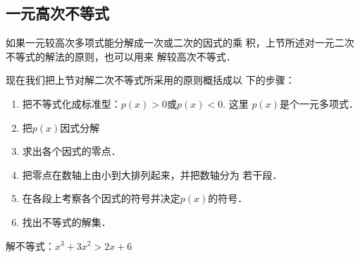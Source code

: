 \subsection{一元高次不等式}
如果一元较高次多项式能分解成一次或二次的因式的乘
积，上节所述对一元二次不等式的解法的原则，也可以用来
解较高次不等式．

现在我们把上节对解二次不等式所采用的原则概括成以
下的步骤：
\begin{enumerate}
    \item 把不等式化成标准型：$p(x)>0$或$p(x)<0$. 这里
$p(x)$是个一元多项式．
\item 把$p(x)$因式分解
\item 求出各个因式的零点．
\item 把零点在数轴上由小到大排列起来，并把数轴分为
若干段．
\item 在各段上考察各个因式的符号并决定$p(x)$的符号．
\item 找出不等式的解集．
\end{enumerate}


\begin{example}
    解不等式：$x^3+3x^2>2x+6$
\end{example}

